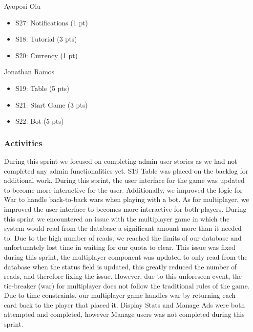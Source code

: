 Ayoposi Olu

\begin{itemize}
    \item S27: Notifications (1 pt)
    \item S18: Tutorial (3 pts)
    \item S20: Currency (1 pt)
\end{itemize}


Jonathan Ramos

\begin{itemize}
    \item S19: Table (5 pts)
    \item S21: Start Game (3 pts)
    \item S22: Bot (5 pts)
\end{itemize}



\subsubsection{Activities}
During this sprint we focused on completing admin user stories as we had not completed any admin functionalities yet. S19 Table was placed on the backlog for additional work. During this sprint, the user interface for the game was updated to become more interactive for the user. Additionally, we improved the logic for War to handle back-to-back wars when playing with a bot. As for multiplayer, we improved the user interface to becomes more interactive for both players. During this sprint we encountered an issue with the multiplayer game in which the system would read from the database a significant amount more than it needed to. Due to the high number of reads, we reached the limits of our database and unfortunately lost time in waiting for our quota to clear. This issue was fixed during this sprint, the multiplayer component was updated to only read from the database when the status field is updated, this greatly reduced the number of reads, and therefore fixing the issue. However, due to this unforeseen event, the tie-breaker (war) for multiplayer does not follow the traditional rules of the game. Due to time constraints, our multiplayer game handles war by returning each card back to the player that placed it. Display Stats and Manage Ads were both attempted and completed, however Manage users was not completed during this sprint. 


